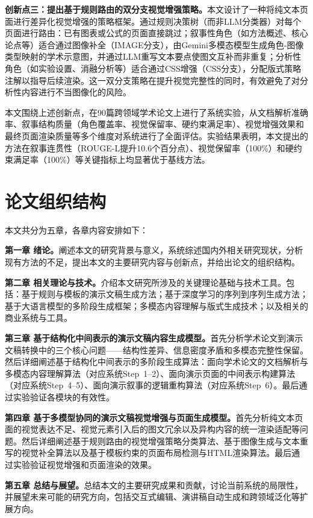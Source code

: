 \textbf{创新点三：提出基于规则路由的双分支视觉增强策略。}本文设计了一种将纯文本页面进行差异化视觉增强的策略框架。通过规则决策树（而非LLM分类器）对每个页面进行路由：已有图表或公式的页面直接跳过；叙事性角色（如方法概述、核心论点等）适合通过图像补全（IMAGE分支），由Gemini多模态模型生成角色-图像类型映射的学术示意图，并通过LLM重写文本要点使图文互补而非重复；分析性角色（如实验设置、消融分析等）适合通过CSS增强（CSS分支），分配版式策略注解以指导后续渲染。这一双分支策略在提升视觉完整性的同时，有效避免了对分析性内容进行不当图像化的风险。

本文围绕上述创新点，在90篇跨领域学术论文上进行了系统实验，从文档解析准确率、叙事结构质量（角色覆盖率、视觉保留率、硬约束满足率）、视觉增强效果和最终页面渲染质量等多个维度对系统进行了全面评估。实验结果表明，本文提出的方法在叙事连贯性（ROUGE-L提升10.6个百分点）、视觉保留率（100\%）和硬约束满足率（100\%）等关键指标上均显著优于基线方法。

\section{论文组织结构}

本文共分为五章，各章内容安排如下：

\textbf{第一章 绪论。}阐述本文的研究背景与意义，系统综述国内外相关研究现状，分析现有方法的不足，提出本文的主要研究内容与创新点，并给出论文的组织结构。

\textbf{第二章 相关理论与技术。}介绍本文研究所涉及的关键理论基础与技术工具。包括：基于规则与模板的演示文稿生成方法；基于深度学习的序列到序列生成方法；基于大语言模型的多阶段生成框架；多模态内容理解与版式生成技术；以及相关的商业系统与工具。

\textbf{第三章 基于结构化中间表示的演示文稿内容生成模型。}首先分析学术论文到演示文稿转换中的三个核心问题——结构性差异、信息密度矛盾和多模态完整性保留。然后详细阐述基于结构化中间表示的多阶段生成算法：面向学术论文的文档解析与多模态内容理解算法（对应系统Step~1--2）、面向演示页面的中间表示构建算法（对应系统Step~4--5）、面向演示叙事的逻辑重构算法（对应系统Step~6）。最后通过实验验证各模块的有效性。

\textbf{第四章 基于多模型协同的演示文稿视觉增强与页面生成模型。}首先分析纯文本页面的视觉表达不足、视觉元素引入后的图文冗余以及异构内容的统一渲染适配等问题。然后详细阐述基于规则路由的视觉增强策略分类算法、基于图像生成与文本重写的视觉补全算法以及基于模板约束的页面布局检测与HTML渲染算法。最后通过实验验证视觉增强和页面渲染的效果。

\textbf{第五章 总结与展望。}总结本文的主要研究成果和贡献，讨论当前系统的局限性，并展望未来可能的研究方向，包括交互式编辑、演讲稿自动生成和跨领域泛化等扩展方向。


